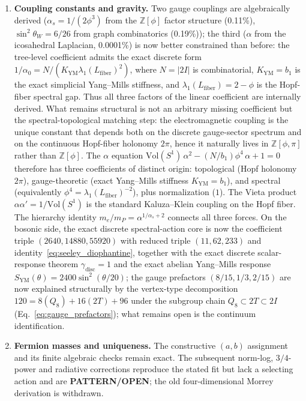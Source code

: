 \documentclass[12pt,a4paper]{article}
\theoremstyle{definition}
\begin{document}
\begin{enumerate}
\item \textbf{Coupling constants and gravity.}  Two gauge couplings are algebraically derived ($\alpha_s = 1/(2\phi^3)$ from the $\mathbb{Z}[\phi]$ factor structure (0.11\%), $\sin^2\theta_W = 6/26$ from graph combinatorics (0.19\%)); the third ($\alpha$ from the icosahedral Laplacian, 0.0001\%) is now better constrained than before: the tree-level coefficient admits the exact discrete form $1/\alpha_0 = N/(K_{\mathrm{YM}}\lambda_1(L_{\mathrm{fiber}})^2)$, where $N=|2I|$ is combinatorial, $K_{\mathrm{YM}} = b_1$ is the exact simplicial Yang--Mills stiffness, and $\lambda_1(L_{\mathrm{fiber}})=2-\phi$ is the Hopf-fiber spectral gap.  Thus all three factors of the linear coefficient are internally derived.  What remains structural is not an arbitrary missing coefficient but the spectral-topological matching step: the electromagnetic coupling is the unique constant that depends both on the discrete gauge-sector spectrum and on the continuous Hopf-fiber holonomy $2\pi$, hence it naturally lives in $\mathbb{Z}[\phi,\pi]$ rather than $\mathbb{Z}[\phi]$.  The $\alpha$ equation $\text{Vol}(S^1)\,\alpha^2 - (N/b_1)\phi^4\,\alpha + 1 = 0$ therefore has three coefficients of distinct origin: topological (Hopf holonomy $2\pi$), gauge-theoretic (exact Yang--Mills stiffness $K_{\mathrm{YM}} = b_1$), and spectral (equivalently $\phi^4 = \lambda_1(L_{\mathrm{fiber}})^{-2}$), plus normalization ($1$).  The Vieta product $\alpha\alpha' = 1/\text{Vol}(S^1)$ is the standard Kaluza--Klein coupling on the Hopf fiber.  The hierarchy identity $m_e/m_P = \alpha^{1/\alpha_s+2}$ connects all three forces.  On the bosonic side, the exact discrete spectral-action core is now the coefficient triple $(2640,14880,55920)$ with reduced triple $(11,62,233)$ and identity~\eqref{eq:seeley_diophantine}, together with the exact discrete scalar-response theorem $\gamma_{\mathrm{disc}} = 1$ and the exact abelian Yang--Mills response $S_{\mathrm{YM}}(\theta)=2400\sin^2(\theta/20)$; the gauge prefactors $(8/15, 1/3, 2/15)$ are now explained structurally by the vertex-type decomposition $120 = 8(Q_8) + 16(2T) + 96$ under the subgroup chain $Q_8 \subset 2T \subset 2I$ (Eq.~\ref{eq:gauge_prefactors}); what remains open is the continuum identification.

\item \textbf{Fermion masses and uniqueness.}  The constructive $(a,b)$ assignment and its finite algebraic checks remain exact.  The subsequent norm-log, $3/4$-power and radiative corrections reproduce the stated fit but lack a selecting action and are \textbf{PATTERN/OPEN}; the old four-dimensional Morrey derivation is withdrawn.


\end{enumerate}
\end{document}
